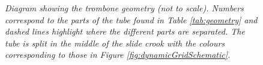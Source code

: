 \begin{figure}[t]
\begin{tikzpicture}[scale = 8]
    
    \end{tikzpicture}
    \caption{\it Diagram showing the trombone geometry (not to scale). Numbers correspond to the parts of the tube found in Table \ref{tab:geometry} and dashed lines highlight where the different parts are separated. The tube is split in the middle of the slide crook with the colours corresponding to those in Figure \ref{fig:dynamicGridSchematic}.}
    \label{fig:tromboneSchematic}
\end{figure}